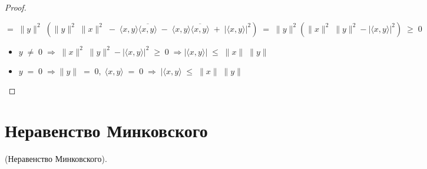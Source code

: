 \documentclass[12px]{report}
\begin{document}
\begin{proof}
\begin{enumerate}
        $$= \; \|y\|^2 \; (\|y\|^2 \; \|x\|^2 \; - \; \langle x, y \rangle \overline{\langle x, y \rangle} \; - \; \langle x,y \rangle \overline{\langle x, y \rangle} \; + \; |\langle x, y \rangle|^2) \; = \; \|y\|^2(\|x\|^2 \; \|y\|^2 - |\langle x, y \rangle|^2) \; \geq \; 0$$
        
        \newline
        
        \begin{itemize}
        
        \vspace{0.4cm} \item $y \; \neq \; 0 \; \Longrightarrow \; \|x\|^2 \; \|y\|^2 - |\langle x, y \rangle|^2 \; \geq \; 0 \; \Longrightarrow |\langle x, y \rangle| \; \leq \; \|x\| \; \|y\|$
        
        \vspace{0.4cm} \item $y \; = \; 0 \; \Longrightarrow \|y\| \; = \; 0, \; \langle x, y \rangle \; = \; 0 \; \Longrightarrow \; |\langle x, y \rangle \; \leq \; \|x\| \; \|y\|$
        \end{itemize}
    \end{enumerate}
\end{proof}

\clearpage
\section{Неравенство Минковского}
\begin{shth}
    \begin{theorem}
        (Неравенство Минковского).
        \newline
    \end{theorem}
\end{shth}
\end{document}

